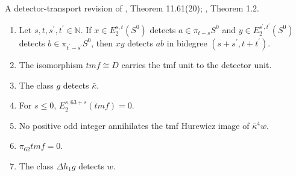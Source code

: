 \begin{theorem}
\label{frontier:Literature:860e3947f28a}
A detector-transport revision of \cite{BR21}, Theorem 11.61(20); \cite{tmf}, Theorem 1.2.\par

\begin{enumerate}
\item Let $s,t,s^{\prime},t^{\prime}\in\mathbb N$. If $x\in E_2^{s,t}(S^0)$ detects $a\in\pi_{t-s}S^0$ and $y\in E_2^{s^{\prime},t^{\prime}}(S^0)$ detects $b\in\pi_{t^{\prime}-s^{\prime}}S^0$, then $xy$ detects $ab$ in bidegree $(s+s^{\prime},t+t^{\prime})$.
\item The isomorphism $\mathit{tmf}\cong D$ carries the tmf unit to the detector unit.
\item The class $g$ detects $\bar\kappa$.
\item For $s\le0$, $E_2^{s,63+s}(\mathit{tmf})=0$.
\item No positive odd integer annihilates the tmf Hurewicz image of $\bar\kappa^4w$.
\item $\pi_{62}\mathit{tmf}=0$.
\item The class $\Delta h_1g$ detects $w$.
\end{enumerate}

\end{theorem}
